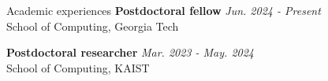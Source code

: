 \begin{rSection}{Academic experiences}
\textbf{Postdoctoral fellow} \hfill {\em Jun. 2024 - Present} \\
  School of Computing, Georgia Tech

\textbf{Postdoctoral researcher} \hfill {\em Mar. 2023 - May. 2024} \\
  School of Computing, KAIST
\end{rSection}

